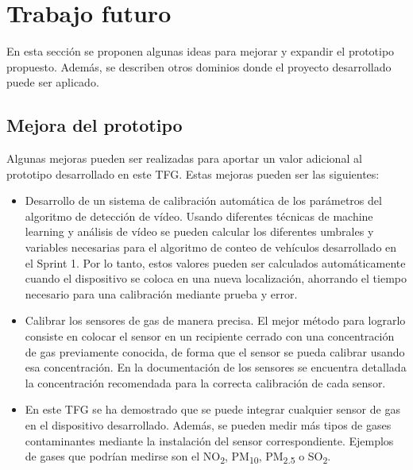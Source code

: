 \section{Trabajo futuro}
En esta sección se proponen algunas ideas para mejorar y expandir el prototipo propuesto. Además, se describen otros dominios donde el proyecto desarrollado puede ser aplicado.

\subsection{Mejora del prototipo}
Algunas mejoras pueden ser realizadas para aportar un valor adicional al prototipo desarrollado en este \ac{TFG}. Estas mejoras pueden ser las siguientes:

\begin{itemize}
	\item Desarrollo de un sistema de calibración automática de los parámetros del algoritmo de detección de vídeo. Usando diferentes técnicas de machine learning y análisis de vídeo se pueden calcular los diferentes umbrales y variables necesarias para el algoritmo de conteo de vehículos desarrollado en el Sprint 1. Por lo tanto, estos valores pueden ser calculados automáticamente cuando el dispositivo se coloca en una nueva localización, ahorrando el tiempo necesario para una calibración mediante prueba y error.
	
	\item Calibrar los sensores de gas de manera precisa. El mejor método para lograrlo consiste en colocar el sensor en un recipiente cerrado con una concentración de gas previamente conocida, de forma que el sensor se pueda calibrar usando esa concentración. En la documentación de los sensores se encuentra detallada la concentración recomendada para la correcta calibración de cada sensor.
	
	\item En este \ac{TFG} se ha demostrado que se puede integrar cualquier sensor de gas en el dispositivo desarrollado. Además, se pueden medir más tipos de gases contaminantes mediante la instalación del sensor correspondiente. Ejemplos de gases que podrían medirse son el NO\textsubscript{2}, PM\textsubscript{10}, PM\textsubscript{2.5} o  SO\textsubscript{2}.
	
\end{itemize}


